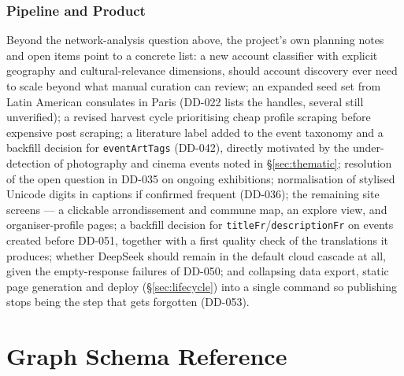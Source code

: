 \documentclass[12pt, a4paper]{report}
\begin{document}
\subsection{Pipeline and Product}

Beyond the network-analysis question above, the project's own planning
notes and open items point to a concrete list: a new account classifier
with explicit geography and cultural-relevance dimensions, should account
discovery ever need to scale beyond what manual curation can review; an
expanded seed set from Latin American consulates in Paris (DD-022 lists
the handles, several still unverified); a revised harvest cycle
prioritising cheap profile scraping before expensive post scraping; a
literature label added to the event taxonomy and a backfill decision for
\texttt{eventArtTags} (DD-042), directly motivated by the
under-detection of photography and cinema events noted in
\S\ref{sec:thematic}; resolution of the open question in DD-035 on
ongoing exhibitions; normalisation of stylised Unicode digits in captions
if confirmed frequent (DD-036); the remaining site screens — a
clickable arrondissement and commune map, an explore view, and
organiser-profile pages; a backfill decision for
\texttt{titleFr}/\texttt{descriptionFr} on events created before DD-051,
together with a first quality check of the translations it produces;
whether DeepSeek should remain in the default cloud cascade at all, given
the empty-response failures of DD-050; and collapsing data export, static
page generation and deploy (\S\ref{sec:lifecycle}) into a single command
so publishing stops being the step that gets forgotten (DD-053).


\appendix

\chapter{Graph Schema Reference}
\label{app:schema}
\end{document}

